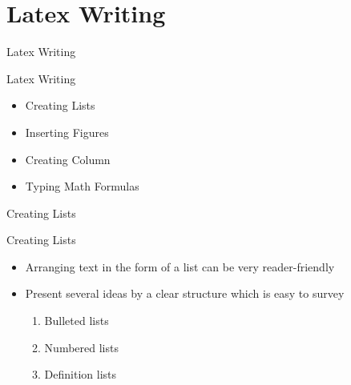 \documentclass[11pt]{beamer}
\begin{document}
	\section{Latex Writing}
	\begin{frame}{}
		\begin{center}
			\huge {Latex Writing}
		\end{center}
	\end{frame}
	\begin{frame}{Latex Writing}
		\begin{itemize}
			\item Creating Lists
			\item Inserting Figures
			\item Creating Column
			\item Typing Math Formulas
		\end{itemize}
	\end{frame}
	\begin{frame}{}
		\begin{center}
			\huge {Creating Lists}
		\end{center}	
	\end{frame}
	\begin{frame}{Creating Lists}
		\begin{itemize}
			\item Arranging text in the form of a list can be very reader-friendly
			\item Present several ideas by a clear structure which is easy to survey
			\begin{enumerate}
				\item Bulleted lists
				\item Numbered lists
				\item Definition lists
			\end{enumerate}
		\end{itemize}
	\end{frame}
\end{document}
